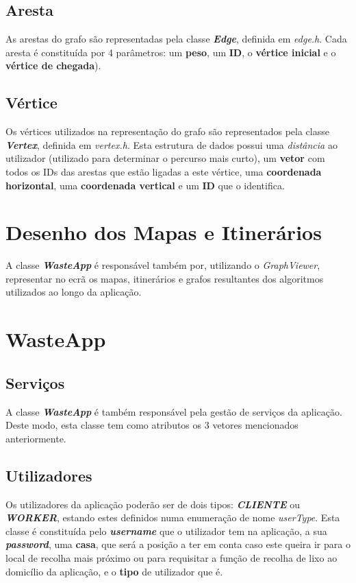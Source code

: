 \documentclass[article, a4paper, 12pt, oneside]{memoir}
\begin{document}
\subsection{Aresta}

As arestas do grafo são representadas pela classe \textbf{\textit{Edge}}, definida em \textit{edge.h}. Cada aresta é constituída por 4 parâmetros: um \textbf{peso}, um \textbf{ID}, o \textbf{vértice inicial} e o \textbf{vértice de chegada}).

\subsection{Vértice}

Os vértices utilizados na representação do grafo são representados pela classe \textbf{\textit{Vertex}}, definida em \textit{vertex.h}. Esta estrutura de dados possui uma \textit{distância} ao utilizador (utilizado para determinar o percurso mais curto), um \textbf{vetor} com todos os IDs das arestas que estão ligadas a este vértice, uma \textbf{coordenada horizontal}, uma \textbf{coordenada vertical} e um \textbf{ID} que o identifica.

\section{Desenho dos Mapas e Itinerários}

A classe \textbf{\textit{WasteApp}} é responsável também por, utilizando o \textit{GraphViewer}, representar no ecrã os mapas, itinerários e grafos resultantes dos algoritmos utilizados ao longo da aplicação.

\section{WasteApp}

\subsection{Serviços}

A classe \textbf{\textit{WasteApp}} é também responsável pela gestão de serviços da aplicação. Deste modo, esta classe tem como atributos os 3 vetores mencionados anteriormente.

\subsection{Utilizadores}

Os utilizadores da aplicação poderão ser de dois tipos: \textit{\textbf{CLIENTE}} ou \textbf{\textit{WORKER}}, estando estes definidos numa enumeração de nome \textit{userType}. Esta classe é constituída pelo \textit{\textbf{username}} que o utilizador tem na aplicação, a sua \textit{\textbf{password}}, uma \textbf{casa}, que será a posição a ter em conta caso este queira ir para o local de recolha mais próximo ou para requisitar a função de recolha de lixo ao domicílio da aplicação, e o \textbf{tipo} de utilizador que é.
\end{document}
